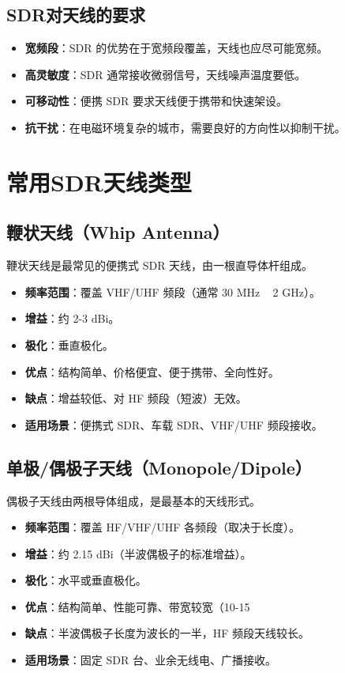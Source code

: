 \documentclass[12pt,UTF8]{ctexbook}
\begin{document}
\subsection{SDR对天线的要求}
\begin{itemize}[leftmargin=2cm]
    \item \textbf{宽频段}：SDR 的优势在于宽频段覆盖，天线也应尽可能宽频。
    \item \textbf{高灵敏度}：SDR 通常接收微弱信号，天线噪声温度要低。
    \item \textbf{可移动性}：便携 SDR 要求天线便于携带和快速架设。
    \item \textbf{抗干扰}：在电磁环境复杂的城市，需要良好的方向性以抑制干扰。
\end{itemize}

\section{常用SDR天线类型}
\label{sec:antenna_types}

\subsection{鞭状天线（Whip Antenna）}
鞭状天线是最常见的便携式 SDR 天线，由一根直导体杆组成。

\begin{itemize}[leftmargin=2cm]
    \item \textbf{频率范围}：覆盖 VHF/UHF 频段（通常 30 MHz ~ 2 GHz）。
    \item \textbf{增益}：约 2-3 dBi。
    \item \textbf{极化}：垂直极化。
    \item \textbf{优点}：结构简单、价格便宜、便于携带、全向性好。
    \item \textbf{缺点}：增益较低、对 HF 频段（短波）无效。
    \item \textbf{适用场景}：便携式 SDR、车载 SDR、VHF/UHF 频段接收。
\end{itemize}

\subsection{单极/偶极子天线（Monopole/Dipole）}
偶极子天线由两根导体组成，是最基本的天线形式。

\begin{itemize}[leftmargin=2cm]
    \item \textbf{频率范围}：覆盖 HF/VHF/UHF 各频段（取决于长度）。
    \item \textbf{增益}：约 2.15 dBi（半波偶极子的标准增益）。
    \item \textbf{极化}：水平或垂直极化。
    \item \textbf{优点}：结构简单、性能可靠、带宽较宽（10-15%
    \item \textbf{缺点}：半波偶极子长度为波长的一半，HF 频段天线较长。
    \item \textbf{适用场景}：固定 SDR 台、业余无线电、广播接收。
\end{itemize}
\end{document}
